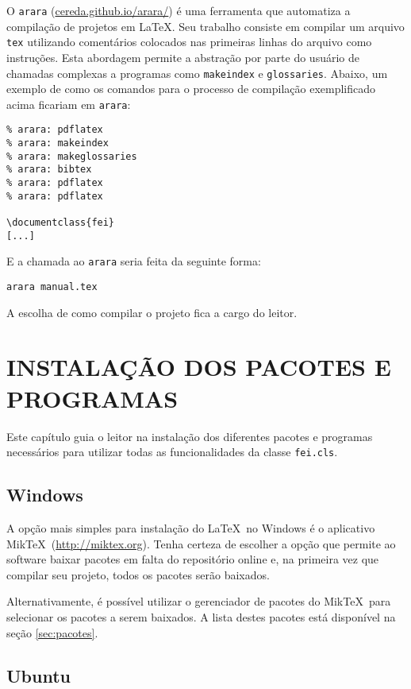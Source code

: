 \documentclass{fei}
\begin{document}
	O \texttt{arara} (\url{cereda.github.io/arara/}) é uma ferramenta que automatiza a compilação de projetos em \LaTeX. Seu trabalho consiste em compilar um arquivo \texttt{tex} utilizando comentários colocados nas primeiras linhas do arquivo como instruções. Esta abordagem permite a abstração por parte do usuário de chamadas complexas a programas como \texttt{makeindex} e \texttt{glossaries}. Abaixo, um exemplo de como os comandos para o processo de compilação exemplificado acima ficariam em \texttt{arara}:
	
	\begin{verbatim}
% arara: pdflatex
% arara: makeindex
% arara: makeglossaries
% arara: bibtex
% arara: pdflatex
% arara: pdflatex

\documentclass{fei}
[...]
	\end{verbatim}
	
	E a chamada ao \texttt{arara} seria feita da seguinte forma:
	
	\texttt{arara manual.tex}
	
	A escolha de como compilar o projeto fica a cargo do leitor.	
	
	\chapter{INSTALAÇÃO DOS PACOTES E PROGRAMAS}	\label{chap:instalacao}
	
	Este capítulo guia o leitor na instalação dos diferentes pacotes e programas necessários para utilizar todas as funcionalidades da classe \texttt{fei.cls}.
	
	\section{Windows}
	
	A opção mais simples para instalação do \LaTeX~no Windows é o aplicativo Mik\TeX~(\url{http://miktex.org}). Tenha certeza de escolher a opção que permite ao software baixar pacotes em falta do repositório online e, na primeira vez que compilar seu projeto, todos os pacotes serão baixados.
	
	Alternativamente, é possível utilizar o gerenciador de pacotes do Mik\TeX~para selecionar os pacotes a serem baixados. A lista destes pacotes está disponível na seção \ref{sec:pacotes}.
	
	\section{Ubuntu}
	
\end{document}
